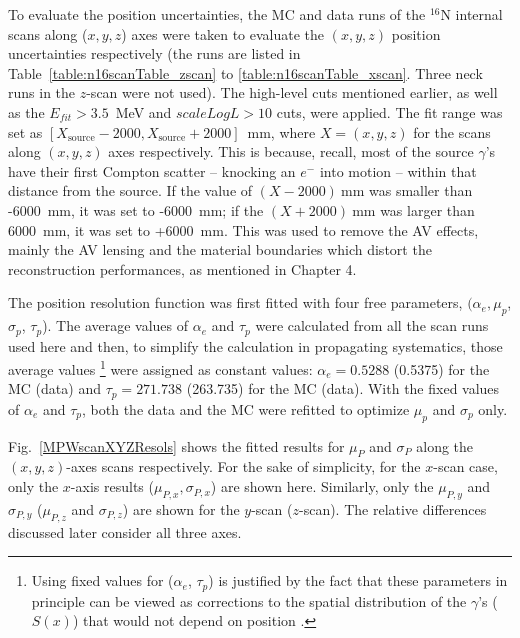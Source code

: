 To evaluate the position uncertainties, the MC and data runs of the $^{16}$N internal scans along ($x, y, z$) axes were taken to evaluate the $(x, y, z)$ position uncertainties respectively (the runs are listed in Table~\ref{table:n16scanTable_zscan} to \ref{table:n16scanTable_xscan}. Three neck runs in the $z$-scan were not used). The high-level cuts mentioned earlier, as well as the $E_{fit}>3.5$~MeV and $scaleLogL>10$ cuts, were applied. The fit range was set as $[X_\mathrm{source}-2000, X_\mathrm{source}+2000]$~mm, where $X=(x,y,z)$ for the scans along $(x,y,z)$ axes respectively. This is because, recall, most of the source $\gamma$'s have their first Compton scatter -- knocking an $e^{-}$ into motion -- within that distance from the source. If the value of $(X-2000)~$mm was smaller than -6000~mm, it was set to -6000~mm; if the $(X+2000)~$mm was larger than 6000~mm, it was set to +6000~mm. This was used to remove the AV effects, mainly the AV lensing and the material boundaries which distort the reconstruction performances, as mentioned in Chapter 4.

The position resolution function was first fitted with four free parameters, $(\alpha_e,\mu_p$, $\sigma_p$, $\tau_p$). The average values of $\alpha_e$ and $\tau_p$ were calculated from all the scan runs used here and then, to simplify the calculation in propagating systematics, those average values \footnote{Using fixed values for ($\alpha_e$, $\tau_p$) is justified by the fact that these parameters in principle can be viewed as corrections to the spatial distribution of the $\gamma$'s ($S(x)$) that would not depend on position \cite{waterunidoc}.} were assigned as constant values: $\alpha_e=0.5288$ (0.5375) for the MC (data) and $\tau_p=271.738$ (263.735) for the MC (data). With the fixed values of $\alpha_e$ and $\tau_p$, both the data and the MC were refitted to optimize $\mu_p$ and $\sigma_p$ only. 

Fig.~\ref{MPWscanXYZResols} shows the fitted results for $\mu_P$ and $\sigma_P$ along the $(x, y, z)$-axes scans respectively. For the sake of simplicity, for the $x$-scan case, only the $x$-axis results ($\mu_{P,x},\sigma_{P,x}$) are shown here. Similarly, only the $\mu_{P,y}$ and $\sigma_{P,y}$ ($\mu_{P,z}$ and $\sigma_{P,z}$) are shown for the $y$-scan ($z$-scan). The relative differences discussed later consider all three axes.

